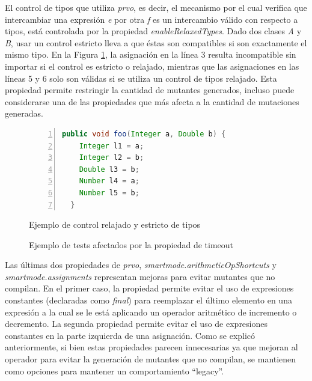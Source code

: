 El control de tipos que utiliza \emph{prvo}, es decir, el mecanismo por el cual verifica que intercambiar una expresi\'on \emph{e} por otra \emph{f} es un intercambio v\'alido con respecto a tipos, est\'a controlada por la propiedad \emph{enableRelaxedTypes}. Dado dos clases \emph{A} y \emph{B}, usar un control estricto lleva a que \'estas son compatibles si son exactamente el mismo tipo. En la Figura \ref{figures.examples.operators.prvo.relaxedVsStrict}, la asignaci\'on en la l\'inea 3 resulta incompatible sin importar si el control es estricto o relajado, mientras que las asignaciones en las l\'ineas 5 y 6 solo son v\'alidas si se utiliza un control de tipos relajado. Esta propiedad permite restringir la cantidad de mutantes generados, incluso puede considerarse una de las propiedades que m\'as afecta a la cantidad de mutaciones generadas.

\begin{figure}
	\begin{lstlisting}[mathescape=true,language=Java,numbers=left]
  public void foo(Integer a, Double b) {
    Integer l1 = a;
    Integer l2 = b;
    Double l3 = b;
    Number l4 = a;
    Number l5 = b;
  }
	\end{lstlisting}
	\caption{Ejemplo de control relajado y estricto de tipos}
	\label{figures.examples.operators.prvo.relaxedVsStrict}
\end{figure}

\begin{figure}
	
	\caption{Ejemplo de tests afectados por la propiedad de timeout}
	\label{figures.examples.confFile.testTimeout}
\end{figure}

Las \'ultimas dos propiedades de \emph{prvo}, \emph{smartmode.arithmeticOpShortcuts} y \emph{smartmode.assignments} representan mejoras para evitar mutantes que no compilan. En el primer caso, la propiedad permite evitar el uso de expresiones constantes (declaradas como \emph{final}) para reemplazar el \'ultimo elemento en una expresi\'on a la cual se le est\'a aplicando un operador aritm\'etico de incremento o decremento. La segunda propiedad permite evitar el uso de expresiones constantes en la parte izquierda de una asignaci\'on. Como se explic\'o anteriormente, si bien estas propiedades parecen innecesarias ya que mejoran al operador para evitar la generaci\'on de mutantes que no compilan, se mantienen como opciones para mantener un comportamiento ``legacy''.

